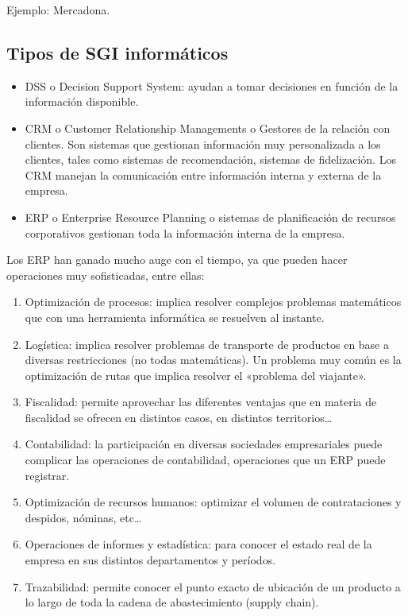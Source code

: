 \documentclass[letterpaper,10pt,spanish]{sphinxmanual}
\begin{document}
Ejemplo: Mercadona.


\subsection{Tipos de SGI informáticos}
\label{\detokenize{tema8:tipos-de-sgi-informaticos}}\begin{itemize}
\item {} 
DSS o Decision Support System: ayudan a tomar decisiones en función de la información disponible.

\item {} 
CRM o Customer Relationship Managements o Gestores de la relación con clientes. Son sistemas que gestionan información muy personalizada a los clientes, tales como sistemas de recomendación, sistemas de fidelización. Los CRM manejan la comunicación entre información interna y externa de la empresa.

\item {} 
ERP o Enterprise Resource Planning o sistemas de planificación de recursos corporativos gestionan toda la información interna de la empresa.

\end{itemize}

Los ERP han ganado mucho auge con el tiempo, ya que pueden hacer operaciones muy sofisticadas, entre ellas:
\begin{enumerate}
\item {} 
Optimización de procesos: implica resolver complejos problemas matemáticos que con una herramienta informática se resuelven al instante.

\item {} 
Logística: implica resolver problemas de transporte de productos en base a diversas restricciones (no todas matemáticas). Un problema muy común es la optimización de rutas que implica resolver el «problema del viajante».

\item {} 
Fiscalidad: permite aprovechar las diferentes ventajas que en materia de fiscalidad se ofrecen en distintos casos, en distintos territorios…

\item {} 
Contabilidad: la participación en diversas sociedades empresariales puede complicar las operaciones de contabilidad, operaciones que un ERP puede registrar.

\item {} 
Optimización de recursos humanos: optimizar el volumen de contrataciones y despidos, nóminas, etc…

\item {} 
Operaciones de informes y estadística: para conocer el estado real de la empresa en sus distintos departamentos y períodos.

\item {} 
Trazabilidad: permite conocer el punto exacto de ubicación de un producto a lo largo de toda la cadena de abastecimiento (supply chain).

\end{enumerate}
\end{document}
